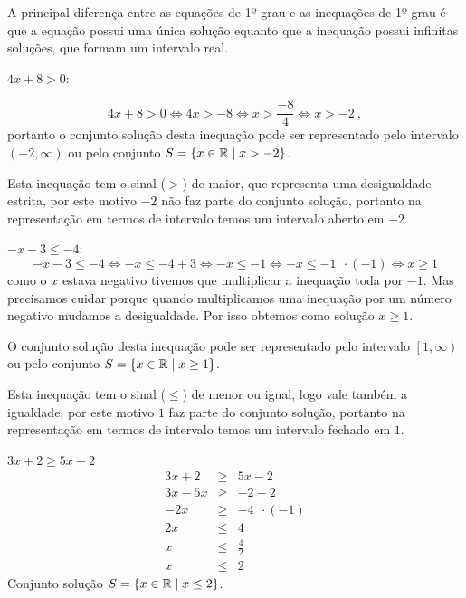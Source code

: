  A principal diferença entre as equações de 1º grau e as inequações de 1º grau é que a equação possui uma única solução equanto que a inequação possui infinitas soluções, que formam um intervalo real.
 
 \begin{exem} 
 $4x + 8 > 0$:
 
\begin{equation}
4x + 8 > 0 \Leftrightarrow 4x > -8 \Leftrightarrow x > \frac{-8}{4} \Leftrightarrow x > -2 \ ,
\end{equation}
 portanto o conjunto solução desta inequação pode ser representado pelo intervalo $\left(-2, \infty \right)$ ou pelo conjunto $S=\{x \in \mathbb{R} \mid x > -2\}$. 
 
 Esta inequação tem o sinal ($>$) de maior, que representa uma desigualdade estrita, por este motivo $-2$ não faz parte do conjunto solução, portanto na representação em termos de intervalo temos um intervalo aberto em $-2$.
 \end{exem}
 
 \begin{exem} 
 $-x-3 \leq -4$:
\begin{equation}
-x-3 \leq -4 \Leftrightarrow -x \leq -4 + 3 \Leftrightarrow -x \leq -1 \Leftrightarrow -x \leq -1 \ \ \cdot (-1) \Leftrightarrow x \geq 1 
\end{equation}
 como o $x$ estava negativo tivemos que multiplicar a inequação toda por $-1$. Mas precisamos cuidar porque quando multiplicamos uma inequação por um número negativo mudamos a desigualdade. Por isso obtemos como solução $x \geq 1$.
 
  O conjunto solução desta inequação pode ser representado pelo intervalo $\left[1, \infty \right)$ ou pelo conjunto $S=\{x \in \mathbb{R} \mid x \geq 1\}$. 
  
  Esta inequação tem o sinal ($\leq$) de menor ou igual, logo vale também a igualdade, por este motivo $1$ faz parte do conjunto solução, portanto na representação em termos de intervalo temos um intervalo fechado em $1$.
 \end{exem}
 
 \begin{exem} 
 $3x+2 \geq 5x-2$
 \begin{eqnarray*}
 3x+2 & \geq & 5x-2 \\
 3x - 5x & \geq & -2-2 \\
 -2x & \geq & -4 \ \ \cdot (-1) \\
 2x & \leq & 4 \\
 x & \leq & \frac{4}{2} \\
 x & \leq & 2
 \end{eqnarray*}
 Conjunto solução $S=\{x \in \mathbb{R} \mid x \leq 2\}$.
 \end{exem}
 
